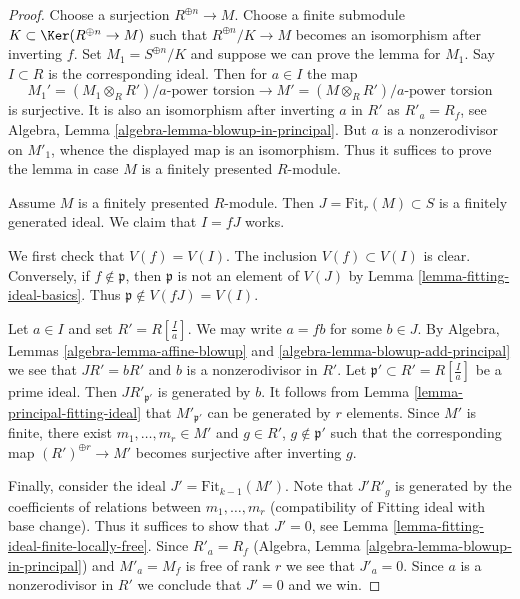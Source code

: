 \begin{proof}
Choose a surjection $R^{\oplus n} \to M$. Choose a finite submodule
$K \subset \Ker(R^{\oplus n} \to M)$ such that $R^{\oplus n}/K \to M$
becomes an isomorphism after inverting $f$. Set $M_1 = S^{\oplus n}/K$
and suppose we can prove the lemma for $M_1$. Say $I \subset R$ is the
corresponding ideal. Then for $a \in I$ the map
$$
M_1' = (M_1 \otimes_R R')/a\text{-power torsion}
\longrightarrow
M' = (M \otimes_R R')/a\text{-power torsion}
$$
is surjective. It is also an isomorphism after inverting $a$ in $R'$
as $R'_a = R_f$, see Algebra, Lemma \ref{algebra-lemma-blowup-in-principal}.
But $a$ is a nonzerodivisor on $M'_1$, whence the displayed map is an
isomorphism. Thus it suffices to prove the lemma in case $M$ is a finitely
presented $R$-module.

\medskip\noindent
Assume $M$ is a finitely presented $R$-module.
Then $J = \text{Fit}_r(M) \subset S$ is a finitely generated ideal.
We claim that $I = fJ$ works.

\medskip\noindent
We first check that $V(f) = V(I)$. The inclusion $V(f) \subset V(I)$ is
clear. Conversely, if $f \not \in \mathfrak p$, then
$\mathfrak p$ is not an element of $V(J)$ by 
Lemma \ref{lemma-fitting-ideal-basics}.
Thus $\mathfrak p \not \in V(fJ) = V(I)$.

\medskip\noindent
Let $a \in I$ and set $R' = R[\frac{I}{a}]$. We may write $a = fb$
for some $b \in J$. By Algebra, Lemmas \ref{algebra-lemma-affine-blowup} and
\ref{algebra-lemma-blowup-add-principal} we see that $J R' = b R'$
and $b$ is a nonzerodivisor in $R'$. 
Let $\mathfrak p' \subset R' = R[\frac{I}{a}]$ be
a prime ideal. Then $JR'_{\mathfrak p'}$ is generated by $b$.
It follows from
Lemma \ref{lemma-principal-fitting-ideal}
that $M'_{\mathfrak p'}$ can be generated by $r$ elements.
Since $M'$ is finite, there exist $m_1, \ldots, m_r \in M'$ and
$g \in R'$, $g \not \in \mathfrak p'$ such that the corresponding map
$(R')^{\oplus r} \to M'$ becomes surjective after inverting $g$.

\medskip\noindent
Finally, consider the ideal $J' = \text{Fit}_{k - 1}(M')$.
Note that $J' R'_g$ is generated by the coefficients of relations between
$m_1, \ldots, m_r$ (compatibility of Fitting ideal with base change).
Thus it suffices to show that $J' = 0$, see
Lemma \ref{lemma-fitting-ideal-finite-locally-free}.
Since $R'_a = R_f$ (Algebra, Lemma \ref{algebra-lemma-blowup-in-principal})
and $M'_a = M_f$ is free of rank $r$ we see that $J'_a = 0$.
Since $a$ is a nonzerodivisor in $R'$ we
conclude that $J' = 0$ and we win.
\end{proof}












